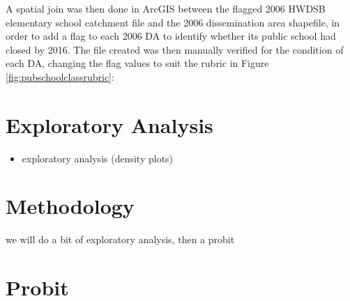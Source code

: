 \documentclass[]{elsarticle} %
\providecommand{\tightlist}{%
  \setlength{\itemsep}{0pt}\setlength{\parskip}{0pt}}
\begin{document}
A spatial join was then done in ArcGIS between the flagged 2006 HWDSB
elementary school catchment file and the 2006 dissemination area
shapefile, in order to add a flag to each 2006 DA to identify whether
its public school had closed by 2016. The file created was then manually
verified for the condition of each DA, changing the flag values to suit
the rubric in Figure \ref{fig:pubschoolclassrubric}:

\begin{table}

\caption{\label{tab:table1-create}\label{tab:pubschoolclassrubric} Public School Catchment Classification Rubric}
\centering
{}
\end{table}

\hypertarget{exploratory-analysis}{%
\section{Exploratory Analysis}\label{exploratory-analysis}}

\begin{itemize}
\tightlist
\item
  exploratory analysis (density plots)
\end{itemize}

\hypertarget{methodology}{%
\section{Methodology}\label{methodology}}

we will do a bit of exploratory analysis, then a probit

\hypertarget{probit}{%
\section{Probit}\label{probit}}
\end{document}
